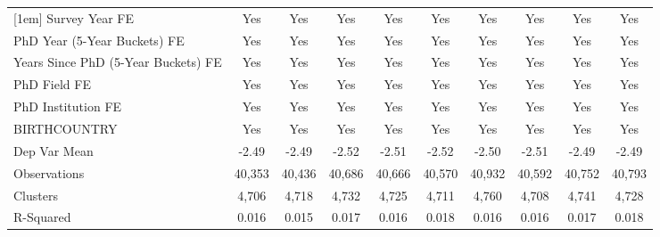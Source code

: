 \begin{table}[htbp]
\begin{tabular}{l*{9}{c}}
[1em]
Survey Year FE&         Yes         &         Yes         &         Yes         &         Yes         &         Yes         &         Yes         &         Yes         &         Yes         &         Yes         \\
[1em]
PhD Year (5-Year Buckets) FE&         Yes         &         Yes         &         Yes         &         Yes         &         Yes         &         Yes         &         Yes         &         Yes         &         Yes         \\
[1em]
Years Since PhD (5-Year Buckets) FE&         Yes         &         Yes         &         Yes         &         Yes         &         Yes         &         Yes         &         Yes         &         Yes         &         Yes         \\
[1em]
PhD Field FE&         Yes         &         Yes         &         Yes         &         Yes         &         Yes         &         Yes         &         Yes         &         Yes         &         Yes         \\
[1em]
PhD Institution FE&         Yes         &         Yes         &         Yes         &         Yes         &         Yes         &         Yes         &         Yes         &         Yes         &         Yes         \\
[1em]
BIRTHCOUNTRY&         Yes         &         Yes         &         Yes         &         Yes         &         Yes         &         Yes         &         Yes         &         Yes         &         Yes         \\
\hline
Dep Var Mean&       -2.49         &       -2.49         &       -2.52         &       -2.51         &       -2.52         &       -2.50         &       -2.51         &       -2.49         &       -2.49         \\
Observations&      40,353         &      40,436         &      40,686         &      40,666         &      40,570         &      40,932         &      40,592         &      40,752         &      40,793         \\
Clusters&       4,706         &       4,718         &       4,732         &       4,725         &       4,711         &       4,760         &       4,708         &       4,741         &       4,728         \\
R-Squared&       0.016         &       0.015         &       0.017         &       0.016         &       0.018         &       0.016         &       0.016         &       0.017         &       0.018         \\

\end{tabular}
\end{table}
